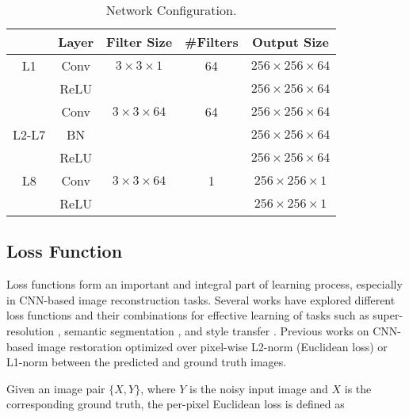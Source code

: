 \documentclass[journal]{IEEEtran}
\begin{document}
\begin{table}[htp!]
	\renewcommand{\arraystretch}{1.3}
	\caption{Network Configuration.}
	\label{tab:network-config}
	\centering
	\begin{tabular}{c|c|c|c|c}
		\hline
		\hline
		& Layer &   Filter Size & \#Filters&Output Size   \\
		\hline
 		L1&Conv &  $3\times 3 \times 1$ & 64&$256 \times 256 \times 64$   \\
 		&ReLU &   & &$256 \times 256 \times 64$   \\
		\hline
 		&Conv &   $3\times 3 \times 64$ & 64 & $256 \times 256 \times 64$  \\
		L2-L7&BN &    & &$256 \times 256 \times 64$  \\
		&ReLU &    & &$256 \times 256 \times 64$  \\
		\hline
 		L8&Conv &  $3\times 3 \times 64$ & 1&$256 \times 256 \times 1$   \\
 		&ReLU &     & &$256 \times 256 \times 1$   \\
		\hline
		\hline
	\end{tabular}
\end{table}





\subsection{Loss Function}
Loss functions form an important and integral part of learning process, especially in CNN-based image reconstruction tasks. Several works have explored different loss functions and their combinations for effective learning of tasks such as super-resolution \cite{cnnsuper}, semantic segmentation \cite{semantic_segmentation}, and style transfer \cite{style_transfer}. Previous works on CNN-based image restoration optimized over pixel-wise L2-norm (Euclidean loss) or L1-norm between the predicted and ground truth images.

Given an image pair $\{X, Y\}$, where $Y$ is the noisy input image and $X$ is the corresponding ground truth, the per-pixel Euclidean loss is defined as
\end{document}
